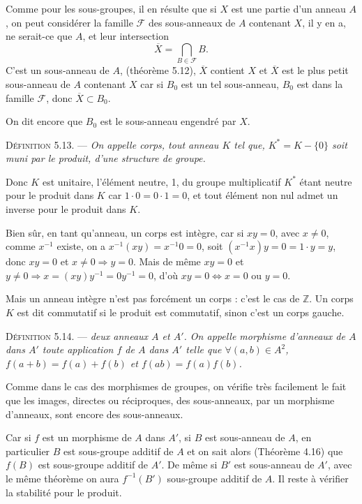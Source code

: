 Comme pour les sous-groupes, il en résulte que si $X$ est une partie d'un anneau $A$, on peut considérer la famille $\mathcal F$ des sous-anneaux de $A$ contenant $X$, il y en a, ne serait-ce que $A$, et leur intersection
\[
\overline X=\bigcap_{B\in\mathcal F}B.
\]
C'est un sous-anneau de $A$, (théorème 5.12), $\overline X$ contient $X$ et $\overline X$ est le plus petit sous-anneau de $A$ contenant $X$ car si $B_0$ est un tel sous-anneau, $B_0$ est dans la famille $\mathcal F$, donc $\overline X\subset B_0$.

On dit encore que $B_0$ est le sous-anneau engendré par $X$.

\medskip\noindent\textsc{Définition 5.13.} --- \emph{On appelle corps, tout anneau $K$ tel que, $K^*=K-\{0\}$ soit muni par le produit, d'une structure de groupe.}

Donc $K$ est unitaire, l'élément neutre, 1, du groupe multiplicatif $K^*$ étant neutre pour le produit dans $K$ car $1\cdot0=0\cdot1=0$, et tout élément non nul admet un inverse pour le produit dans $K$.

Bien sûr, en tant qu'anneau, un corps est intègre, car si $xy=0$, avec $x\ne0$, comme $x^{-1}$ existe, on a $x^{-1}(xy)=x^{-1}0=0$, soit $(x^{-1}x)y=0=1\cdot y=y$, donc $xy=0$ et $x\ne0\Rightarrow y=0$. Mais de même $xy=0$ et $y\ne0\Rightarrow x=(xy)y^{-1}=0y^{-1}=0$, d'où $xy=0\Longleftrightarrow x=0$ ou $y=0$. \bookend

Mais un anneau intègre n'est pas forcément un corps : c'est le cas de $\mathbb Z$. Un corps $K$ est dit commutatif si le produit est commutatif, sinon c'est un corps gauche.


\medskip\noindent\textsc{Définition 5.14.} --- \emph{ deux anneaux $A$ et $A'$. On appelle morphisme d'anneaux de $A$ dans $A'$ toute application $f$ de $A$ dans $A'$ telle que $\forall(a,b)\in A^2$, $f(a+b)=f(a)+f(b)$ et $f(ab)=f(a)f(b)$.}

Comme dans le cas des morphismes de groupes, on vérifie très facilement le fait que les images, directes ou réciproques, des sous-anneaux, par un morphisme d'anneaux, sont encore des sous-anneaux.

Car si $f$ est un morphisme de $A$ dans $A'$, si $B$ est sous-anneau de $A$, en particulier $B$ est sous-groupe additif de $A$ et on sait alors (Théorème 4.16) que $f(B)$ est sous-groupe additif de $A'$. De même si $B'$ est sous-anneau de $A'$, avec le même théorème on aura $f^{-1}(B')$ sous-groupe additif de $A$. Il reste à vérifier la stabilité pour le produit.

